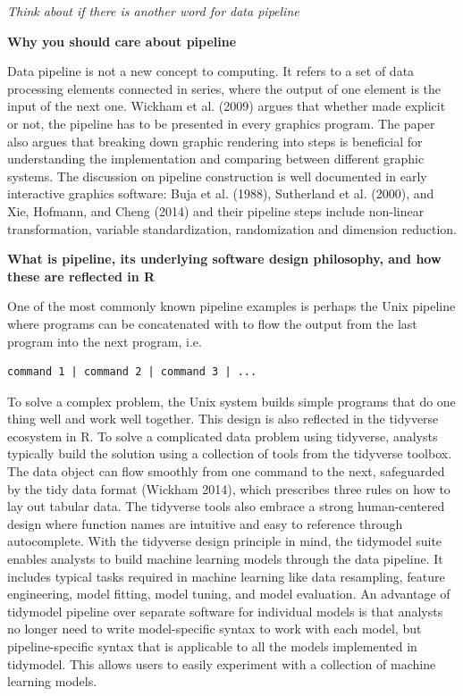 \documentclass[
  letterpaper,
  DIV=11,
  numbers=noendperiod]{scrartcl}
\begin{document}
\emph{Think about if there is another word for data pipeline}

\textbf{Why you should care about pipeline}

Data pipeline is not a new concept to computing. It refers to a set of
data processing elements connected in series, where the output of one
element is the input of the next one. Wickham et al. (2009) argues that
whether made explicit or not, the pipeline has to be presented in every
graphics program. The paper also argues that breaking down graphic
rendering into steps is beneficial for understanding the implementation
and comparing between different graphic systems. The discussion on
pipeline construction is well documented in early interactive graphics
software: Buja et al. (1988), Sutherland et al. (2000), and Xie,
Hofmann, and Cheng (2014) and their pipeline steps include non-linear
transformation, variable standardization, randomization and dimension
reduction.

\textbf{What is pipeline, its underlying software design philosophy, and
how these are reflected in R}

One of the most commonly known pipeline examples is perhaps the Unix
pipeline where programs can be concatenated with \texttt{\textbar{}} to
flow the output from the last program into the next program, i.e.~

\begin{verbatim}
command 1 | command 2 | command 3 | ...
\end{verbatim}

To solve a complex problem, the Unix system builds simple programs that
do one thing well and work well together. This design is also reflected
in the tidyverse ecosystem in R. To solve a complicated data problem
using tidyverse, analysts typically build the solution using a
collection of tools from the tidyverse toolbox. The data object can flow
smoothly from one command to the next, safeguarded by the tidy data
format (Wickham 2014), which prescribes three rules on how to lay out
tabular data. The tidyverse tools also embrace a strong human-centered
design where function names are intuitive and easy to reference through
autocomplete. With the tidyverse design principle in mind, the tidymodel
suite enables analysts to build machine learning models through the data
pipeline. It includes typical tasks required in machine learning like
data resampling, feature engineering, model fitting, model tuning, and
model evaluation. An advantage of tidymodel pipeline over separate
software for individual models is that analysts no longer need to write
model-specific syntax to work with each model, but pipeline-specific
syntax that is applicable to all the models implemented in tidymodel.
This allows users to easily experiment with a collection of machine
learning models.
\end{document}
